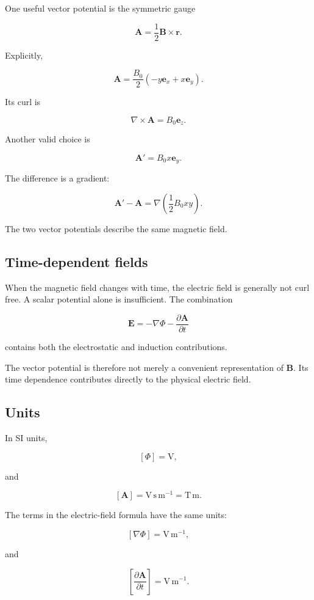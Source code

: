 One useful vector potential is the symmetric gauge

\[
\boxed{
\mathbf{A}
=
\frac{1}{2}
\mathbf{B}\times\mathbf{r}
}.
\]

Explicitly,

\[
\mathbf{A}
=
\frac{B_0}{2}
\left(
-y\mathbf{e}_x
+x\mathbf{e}_y
\right).
\]

Its curl is

\[
\nabla\times\mathbf{A}
=
B_0\mathbf{e}_z.
\]

Another valid choice is

\[
\mathbf{A}'
=
B_0x\mathbf{e}_y.
\]

The difference is a gradient:

\[
\mathbf{A}'-\mathbf{A}
=
\nabla
\left(
\frac{1}{2}B_0xy
\right).
\]

The two vector potentials describe the same magnetic field.

\subsection{Time-dependent fields}

When the magnetic field changes with time, the electric field is generally not curl free. A scalar potential alone is insufficient. The combination

\[
\mathbf{E}
=
-\nabla\Phi
-
\frac{\partial\mathbf{A}}{\partial t}
\]

contains both the electrostatic and induction contributions.

The vector potential is therefore not merely a convenient representation of \(\mathbf{B}\). Its time dependence contributes directly to the physical electric field.

\subsection{Units}

In SI units,

\[
[\Phi]
=
\mathrm{V},
\]

and

\[
[\mathbf{A}]
=
\mathrm{V\,s\,m^{-1}}
=
\mathrm{T\,m}.
\]

The terms in the electric-field formula have the same units:

\[
[\nabla\Phi]
=
\mathrm{V\,m^{-1}},
\]

and

\[
\left[
\frac{\partial\mathbf{A}}{\partial t}
\right]
=
\mathrm{V\,m^{-1}}.
\]

